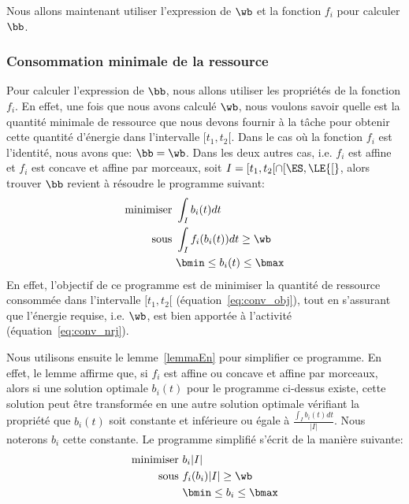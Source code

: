 Nous allons maintenant utiliser l'expression de $\wb$ et la fonction
$f_i$ pour calculer $\bb$.

\subsubsection{Consommation minimale de la ressource}

Pour calculer l'expression de $\bb$, nous allons utiliser les
propriétés de la fonction $f_i$. En effet, une fois que nous avons
calculé $\wb$, nous voulons savoir quelle est la quantité minimale de
ressource que nous devons fournir à la tâche pour obtenir cette
quantité d'énergie dans l'intervalle ${[}t_1,t_2{[}$. Dans le cas où
la fonction $f_i$ est l'identité, nous avons que: $\bb=\wb$. Dans les
deux autres cas, i.e. $f_i$ est affine et $f_i$ est concave et affine
par morceaux, soit $I=[t_1,t_2[ \cap [\ES,\LE{[}$, alors trouver $\bb$
revient à résoudre le programme suivant:
\begin{align}
  \text{minimiser }   & \int_{I} b_i(t)dt \label{eq:conv_obj} \\
  \text{sous } & \int_{I} f_i(b_i(t))dt \ge \wb \label{eq:conv_nrj}\\
                      & \bmin \le b_i(t) \le \bmax \label{eq:conv_min}
\end{align}
En effet, l'objectif de ce programme est de minimiser la quantité de
ressource consommée dans l'intervalle $[t_1,t_2[$
(équation~\eqref{eq:conv_obj}), tout en s'assurant que l'énergie
requise, i.e. $\wb$, est bien apportée à l'activité
(équation~\eqref{eq:conv_nrj}). 

Nous utilisons ensuite le lemme~\ref{lemmaEn} pour simplifier ce
programme. En effet, le lemme affirme que, si $f_i$ est affine ou
concave et affine par morceaux, alors si une solution optimale
$b_i(t)$ pour le programme ci-dessus existe, cette solution peut être
transformée en une autre solution optimale vérifiant la propriété que
$b_i(t)$ soit constante et inférieure ou égale à
$\frac{\int_{I}b_i(t)dt}{|I|}$. Nous noterons $b_i$ cette
constante. Le programme simplifié s'écrit de la manière suivante:
\begin{align}
  \text{minimiser }   & b_i|I| \label{eq:convSimp_obj} \\
  \text{sous } & f_i(b_i)|I| \ge \wb \label{eq:convSimp_nrj}\\
                      &\bmin \le  b_i \le \bmax \label{eq:convSimp_nrj}
\end{align}


